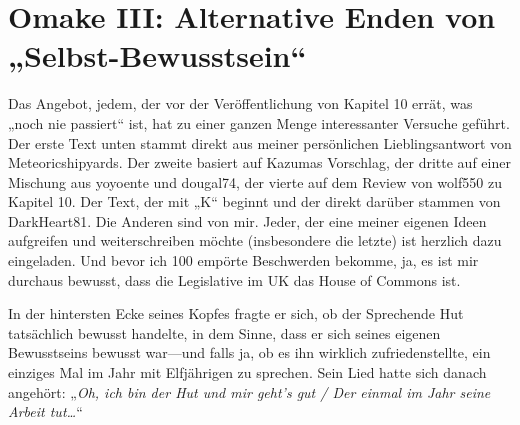 







\section{Omake III: Alternative Enden von „Selbst-Bewusstsein“}

Das Angebot, jedem, der vor der Veröffentlichung von Kapitel 10 errät, was „noch nie passiert“ ist, hat zu einer ganzen Menge interessanter Versuche geführt. Der erste Text unten stammt direkt aus meiner persönlichen Lieblingsantwort von Meteoricshipyards. Der zweite basiert auf Kazumas Vorschlag, der dritte auf einer Mischung aus yoyoente und dougal74, der vierte auf dem Review von wolf550 zu Kapitel 10. Der Text, der mit „K“ beginnt und der direkt darüber stammen von DarkHeart81. Die Anderen sind von mir. Jeder, der eine meiner eigenen Ideen aufgreifen und weiterschreiben möchte (insbesondere die letzte) ist herzlich dazu eingeladen. Und bevor ich 100 empörte Beschwerden bekomme, ja, es ist mir durchaus bewusst, dass die Legislative im UK das House of Commons ist.%

\later

In der hintersten Ecke seines Kopfes fragte er sich, ob der Sprechende Hut tatsächlich bewusst handelte, in dem Sinne, dass er sich seines eigenen Bewusstseins bewusst war—und falls ja, ob es ihn wirklich zufriedenstellte, ein einziges Mal im Jahr mit Elfjährigen zu sprechen. Sein Lied hatte sich danach angehört: „\emph{Oh, ich bin der Hut und mir geht’s gut / Der einmal im Jahr seine Arbeit tut…}“

